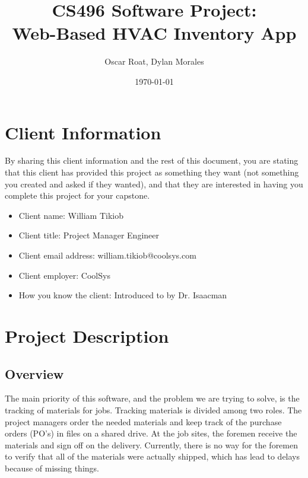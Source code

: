 \documentclass{article}
\title{CS496 Software Project: \\ 
Web-Based HVAC Inventory App}
\author{Oscar Roat, Dylan Morales}
\date{\today}
\begin{document}
\maketitle %

\section{Client Information}
By sharing this client information and the rest of this document, you are stating that this client has provided this project as something they want (not something you created and asked if they wanted), and that they are interested in having you complete this project for your capstone.
\begin{itemize}
    \item Client name: William Tikiob 
    \item Client title: Project Manager Engineer
    \item Client email address: william.tikiob@coolsys.com
    \item Client employer: CoolSys
    \item How you know the client: Introduced to by Dr. Isaacman
\end{itemize}

\section{Project Description}

\subsection{Overview}

The main priority of this software, and the problem we are trying to solve, is the tracking of materials for jobs. Tracking materials is divided among two roles. The project managers order the needed materials and keep track of the purchase orders (PO's) in files on a shared drive. At the job sites, the foremen receive the materials and sign off on the delivery. Currently, there is no way for the foremen to verify that all of the materials were actually shipped, which has lead to delays because of missing things. 
\end{document}

